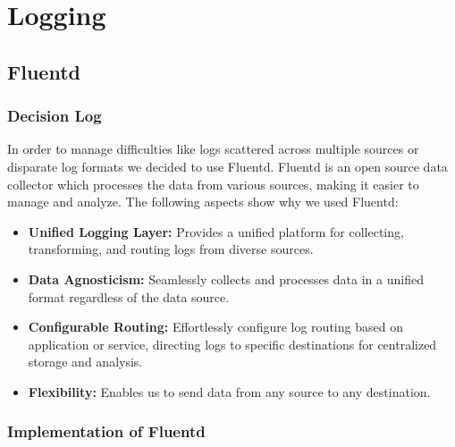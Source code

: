 \section{Logging}
\subsection{Fluentd}
\subsubsection{Decision Log}

In order to manage difficulties like logs scattered across multiple sources or disparate log formats we decided to use Fluentd. 
Fluentd is an open source data collector which processes the data from various sources, making it easier to manage and analyze. 
The following aspects show why we used Fluentd: 
\begin{itemize}
    \item \textbf{Unified Logging Layer:} Provides a unified platform for collecting, transforming, and routing logs from diverse sources.
    \item \textbf{Data Agnosticism:} Seamlessly collects and processes data in a unified format regardless of the data source.
    \item \textbf{Configurable Routing:} Effortlessly configure log routing based on application or service, directing logs to specific destinations for centralized storage and analysis.
    \item \textbf{Flexibility:} Enables us to send data from any source to any destination.
\end{itemize}

\subsubsection{Implementation of Fluentd}

